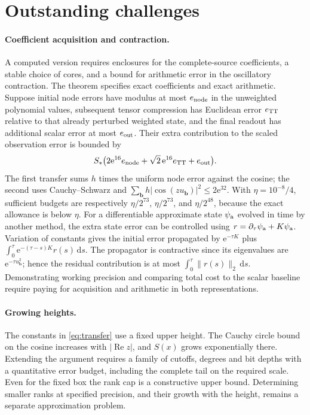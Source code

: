 \documentclass[11pt]{article}
\newcommand{\e}{\mathrm e}
\newcommand{\dd}{\mathrm d}
\begin{document}
\section{Outstanding challenges}
\label{sec:challenges}

\paragraph{Coefficient acquisition and contraction.}
A computed version requires enclosures for the complete-source
coefficients, a stable choice of cores, and a bound for arithmetic
error in the oscillatory contraction. The theorem specifies exact
coefficients and exact arithmetic. Suppose initial node errors have
modulus at most \(e_{\rm node}\) in the unweighted polynomial values,
subsequent tensor compression has Euclidean error \(e_{\rm TT}\)
relative to that already perturbed weighted state, and the final
readout has additional scalar error at most \(e_{\rm out}\).
Their extra contribution to the scaled observation error is
bounded by
\[
 S_*\bigl(2\e^{16}e_{\rm node}
           +\sqrt{2}\,\e^{16}e_{\rm TT}+e_{\rm out}\bigr).
\]
The first transfer sums \(h\) times the uniform node error against
the cosine; the second uses Cauchy--Schwarz and
\(\sum_{\boldsymbol b}h|\cos(zu_{\boldsymbol b})|^2\le2\e^{32}\).
With \(\eta=10^{-8}/4\), sufficient budgets are respectively
\(\eta/2^{73}\), \(\eta/2^{73}\), and \(\eta/2^{48}\), because the
exact allowance is below \(\eta\).
For a differentiable approximate state \(\psi_{\rm a}\) evolved in
time by another method, the extra state error can be controlled
using \(r=\partial_\tau\psi_{\rm a}+K\psi_{\rm a}\).
Variation of constants gives the initial error propagated by
\(\e^{-\tau K}\) plus
\(\int_0^\tau\e^{-(\tau-s)K}r(s)\,\dd s\).
The propagator is contractive since its eigenvalues are
\(\e^{-\tau u_{\boldsymbol b}^2}\); hence the residual contribution
is at most \(\int_0^\tau\|r(s)\|_2\,\dd s\).
Demonstrating working precision and comparing total cost to the
scalar baseline require paying for acquisition and arithmetic in
both representations.

\paragraph{Growing heights.}
The constants in \eqref{eq:transfer} use a fixed upper height.
The Cauchy circle bound on the cosine increases with
\(|\operatorname{Re}z|\), and \(S(x)\) grows exponentially there.
Extending the argument requires a family of cutoffs, degrees
and bit depths with a quantitative error budget, including the
complete tail on the required scale. Even for the fixed box the
rank cap is a constructive upper bound. Determining smaller
ranks at specified precision, and their growth with the height,
remains a separate approximation problem.
\end{document}
